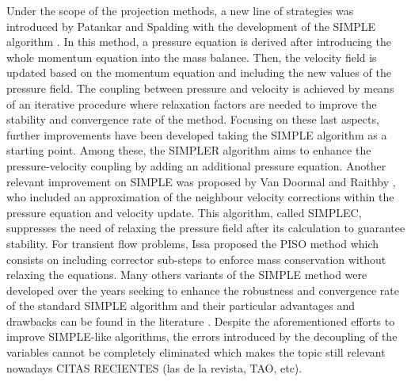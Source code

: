 \documentclass[final,3p,times,11pt,onecolumn]{myElsarticle}
\numberwithin{equation}{section}
\begin{document}
Under the scope of the projection methods, a new line of strategies was introduced by Patankar and Spalding with the development of the SIMPLE algorithm \cite{patankar1972}. In this method, a pressure equation is derived after introducing the whole momentum equation into the mass balance. Then, the velocity field is updated based on the momentum equation and including the new values of the pressure field. The coupling between pressure and velocity is achieved by means of an iterative procedure where  relaxation factors are needed to improve the stability and convergence rate of the method. Focusing on these last aspects, further improvements have been developed taking the SIMPLE algorithm as a starting
point. Among these, the SIMPLER algorithm \cite{patankar1980} aims to enhance the pressure-velocity coupling by adding an additional pressure equation. Another relevant improvement on SIMPLE was proposed by Van Doormal and Raithby \cite{vanDoormal}, who included an approximation of the neighbour velocity corrections within the pressure equation and velocity update. This algorithm, called SIMPLEC, suppresses the need of relaxing the pressure field after its calculation to guarantee stability. For transient flow problems, Issa proposed the PISO method \cite{issa,issa2} which consists on including corrector sub-steps to enforce mass conservation without relaxing the equations. Many others variants of the SIMPLE method were developed over the years seeking to enhance the robustness and convergence rate of the standard SIMPLE algorithm \cite{tao,qu,cheng2,sun} and their particular advantages and drawbacks can be found in the literature \cite{moukalled, liu, wang}. Despite the aforementioned efforts to improve SIMPLE-like algorithms, the errors introduced by the decoupling of the variables
cannot be completely eliminated which makes the topic still relevant nowadays \cite{li2017efficient, xiao2018consistent,aoussou2018iterated} {\color{red} CITAS RECIENTES (las de la revista, TAO, etc)}.
\end{document}
